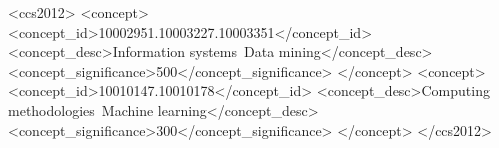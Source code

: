 \documentclass[sigconf,nonacm]{acmart}
\begin{document}
\begin{CCSXML}
<ccs2012>
<concept>
<concept_id>10002951.10003227.10003351</concept_id>
<concept_desc>Information systems~Data mining</concept_desc>
<concept_significance>500</concept_significance>
</concept>
<concept>
<concept_id>10010147.10010178</concept_id>
<concept_desc>Computing methodologies~Machine learning</concept_desc>
<concept_significance>300</concept_significance>
</concept>
</ccs2012>
\end{CCSXML}


\maketitle













\appendix




\end{document}
